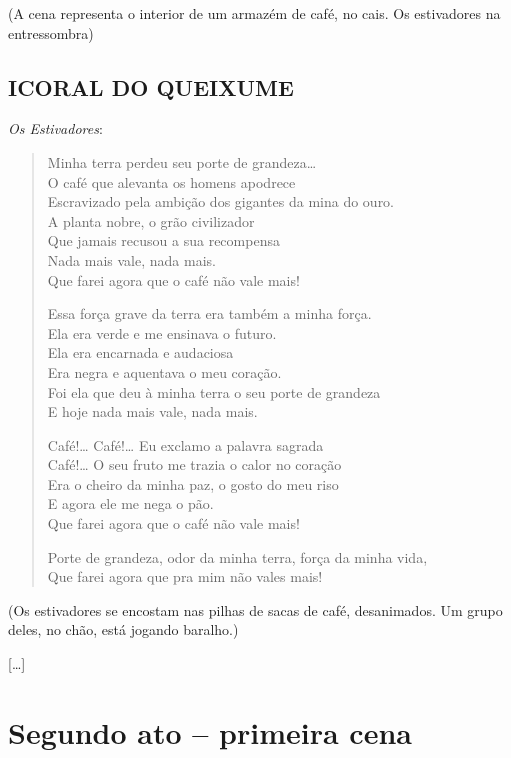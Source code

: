 \hfill\parbox{150pt}{(A cena representa o interior
de um armazém de café, no cais.
Os estivadores na entressombra)}

\section*{I\break CORAL DO QUEIXUME}

\emph{Os Estivadores}:

\begin{verse}
Minha terra perdeu seu porte de grandeza\ldots{}\\
O café que alevanta os homens apodrece\\
Escravizado pela ambição dos gigantes da mina do ouro.\\
A planta nobre, o grão civilizador\\
Que jamais recusou a sua recompensa\\
Nada mais vale, nada mais.\\
Que farei agora que o café não vale mais!

Essa força grave da terra era também a minha força.\\
Ela era verde e me ensinava o futuro.\\
Ela era encarnada e audaciosa\\
Era negra e aquentava o meu coração.\\
Foi ela que deu à minha terra o seu porte de grandeza\\
E hoje nada mais vale, nada mais.

Café!\ldots{} Café!\ldots{} Eu exclamo a palavra sagrada\\
Café!\ldots{} O seu fruto me trazia o calor no coração\\
Era o cheiro da minha paz, o gosto do meu riso\\
E agora ele me nega o pão.\\
Que farei agora que o café não vale mais!

Porte de grandeza, odor da minha terra, força da minha vida,\\
Que farei agora que pra mim não vales mais!
\end{verse}

\hfill\parbox{150pt}{(Os estivadores se encostam nas pilhas
de sacas de café, desanimados. Um grupo
deles, no chão, está jogando baralho.)}

{[}\ldots{}{]}

\chapter{Segundo ato -- primeira cena}

